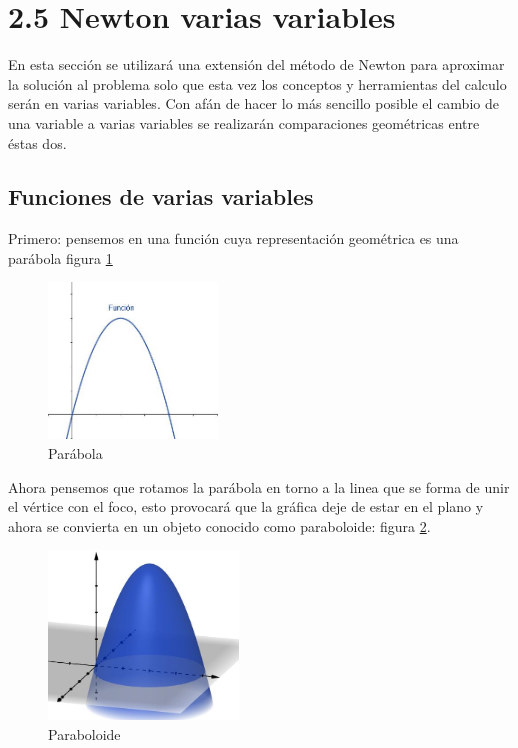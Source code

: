 \section*{2.5 Newton varias variables}

En esta sección se utilizará una extensión del método de Newton para aproximar la solución al problema solo que esta vez los conceptos y herramientas del calculo serán en varias variables. Con afán de hacer lo más sencillo posible el cambio de una variable a varias variables se realizarán comparaciones geométricas entre éstas dos. 

\subsection*{Funciones de varias variables}
Primero: pensemos en una función cuya representación geométrica es una parábola figura \ref{tab:funcion}


\begin{figure}[h!]
\centering
  \includegraphics[width=0.4\textwidth]{funcion1.JPG}
\caption{Parábola}
\label{tab:funcion}
\end{figure} 

Ahora pensemos que rotamos la parábola en torno a la linea que se forma de unir el vértice con el foco, esto provocará que la gráfica deje de estar en el plano y ahora se convierta en un objeto conocido como paraboloide: figura \ref{tab:fun3}.

\begin{figure}[h!]
\centering
  \includegraphics[width=0.45\textwidth]{funcion2.JPG}
\caption{Paraboloide}
\label{tab:fun3}
\end{figure} 

